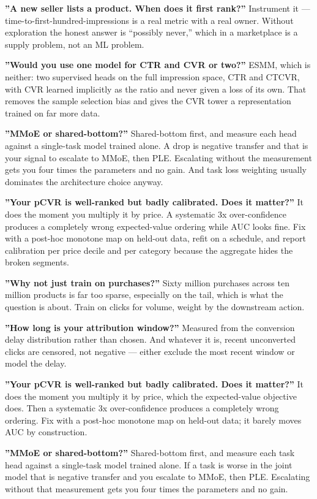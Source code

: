 \documentclass[10pt,twoside]{book}
\newcommand{\csection}[1]{\par\vspace{13pt}\noindent{\sffamily\large\bfseries\color{ink}\raggedright #1\par}\vspace{4pt}}
\begin{document}
\textbf{''A new seller lists a product. When does it first rank?''} Instrument it --- time-to-first-hundred-impressions is a real metric with a real owner. Without exploration the honest answer is ``possibly never,'' which in a marketplace is a supply problem, not an ML problem.\par
\textbf{''Would you use one model for CTR and CVR or two?''} ESMM, which is neither: two supervised heads on the full impression space, CTR and CTCVR, with CVR learned implicitly as the ratio and never given a loss of its own. That removes the sample selection bias and gives the CVR tower a representation trained on far more data.\par
\textbf{''MMoE or shared-bottom?''} Shared-bottom first, and measure each head against a single-task model trained alone. A drop is negative transfer and that is your signal to escalate to MMoE, then PLE. Escalating without the measurement gets you four times the parameters and no gain. And task loss weighting usually dominates the architecture choice anyway.\par
\textbf{''Your pCVR is well-ranked but badly calibrated. Does it matter?''} It does the moment you multiply it by price. A systematic 3x over-confidence produces a completely wrong expected-value ordering while AUC looks fine. Fix with a post-hoc monotone map on held-out data, refit on a schedule, and report calibration per price decile and per category because the aggregate hides the broken segments.\par
\csection{On CVR specifically}
\textbf{''Why not just train on purchases?''} Sixty million purchases across ten million products is far too sparse, especially on the tail, which is what the question is about. Train on clicks for volume, weight by the downstream action.\par
\textbf{''How long is your attribution window?''} Measured from the conversion delay distribution rather than chosen. And whatever it is, recent unconverted clicks are censored, not negative --- either exclude the most recent window or model the delay.\par
\textbf{''Your pCVR is well-ranked but badly calibrated. Does it matter?''} It does the moment you multiply it by price, which the expected-value objective does. Then a systematic 3x over-confidence produces a completely wrong ordering. Fix with a post-hoc monotone map on held-out data; it barely moves AUC by construction.\par
\textbf{''MMoE or shared-bottom?''} Shared-bottom first, and measure each task head against a single-task model trained alone. If a task is worse in the joint model that is negative transfer and you escalate to MMoE, then PLE. Escalating without that measurement gets you four times the parameters and no gain.\par
\end{document}
